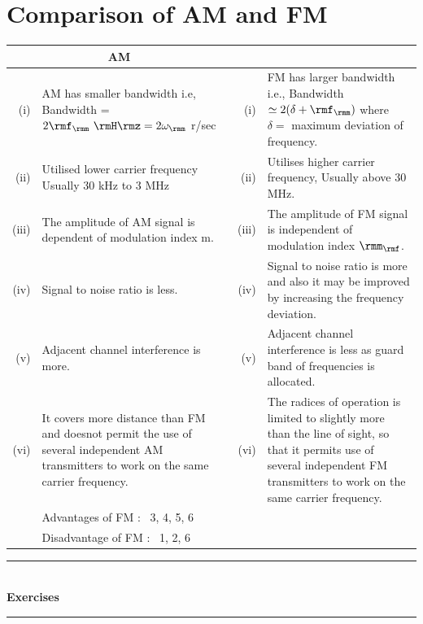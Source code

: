 \section{Comparison of AM and FM}\label{sec8.10}
\begin{center}
\medskip
\begin{tabular}{r@{\;\,}>{\raggedright}p{5.7cm}|r@{\;\,}p{5.7cm}<{\raggedright}}
\hline
 \multicolumn{2}{c|}{AM} & \multicolumn{2}{c}{KM}\\
\hline
(i) & AM has smaller bandwidth i.e, Bandwidth = $2 \rmf_\rmm ~\rmH\rmz
= 2 \omega_\rmm$ r/sec   & (i) & FM has larger bandwidth i.e.,
Bandwidth $\simeq 2 (\delta + \rmf_\rmm)$ where $\delta =$ maximum deviation of frequency.\\[0.2cm]
(ii) & Utilised lower carrier frequency  Usually 30 kHz to 3 MHz & (ii) & Utilises higher
carrier frequency, Usually above 30 MHz.\\[0.2cm]
(iii) & The amplitude of AM signal is dependent of modulation index
m. & (iii) & The amplitude of FM signal is independent of modulation index $\rmm_\rmf$.\\[0.2cm]
(iv) & Signal to noise ratio is less. & (iv) & Signal to noise ratio is more and also it may be improved by 
 increasing the frequency deviation.\\[0.2cm]
(v) & Adjacent channel interference is more. & (v) & Adjacent channel interference is 
less as guard band of frequencies is allocated. \\[0.2cm]
(vi) & It covers more distance than FM and doesnot permit the use of 
several independent AM transmitters to work on the same carrier frequency.
 & (vi) & The radices of operation is limited to slightly more than the line of sight, so that it 
permits use of several independent FM transmitters to work on the same carrier frequency.\\[0.1cm]
& Advantages of FM :~ 3, 4, 5, 6 & &\\[0.1cm]
& Disadvantage of FM :~ 1, 2, 6 & &\\[0.1cm]
\hline
\end{tabular}
\end{center}

\medskip

\begin{center}
\rule{4cm}{1pt}\\
{\bf\Large Exercises}\\[-3pt]
\rule{4cm}{1pt}
\end{center}

